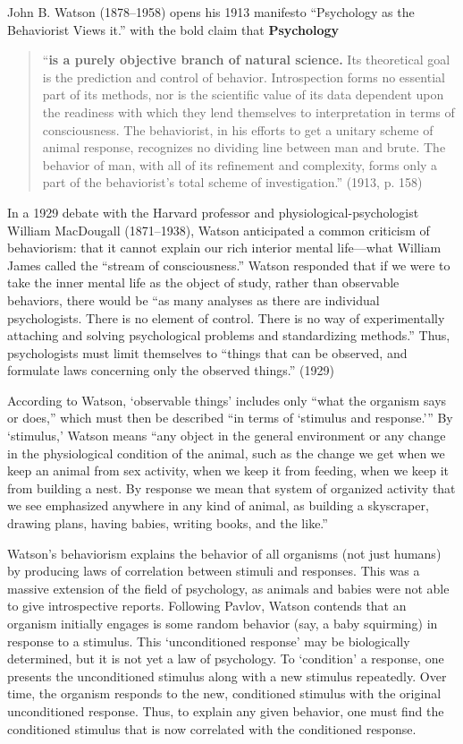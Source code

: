 John B. Watson (1878--1958) opens his 1913 manifesto ``Psychology as the Behaviorist Views it.'' with the bold claim that \textbf{Psychology}

\begin{quote}

``\textbf{is a purely objective branch of natural science.} Its theoretical goal is the prediction and control of behavior. Introspection forms no essential part of its methods, nor is the scientific value of its data dependent upon the readiness with which they lend themselves to interpretation in terms of consciousness. The behaviorist, in his efforts to get a unitary scheme of animal response, recognizes no dividing line between man and brute. The behavior of man, with all of its refinement and complexity, forms only a part of the behaviorist's total scheme of investigation.'' (1913, p. 158)
\end{quote}

In a 1929 debate with the Harvard professor and physiological-psychologist William MacDougall (1871--1938), Watson anticipated a common criticism of behaviorism: that it cannot explain our rich interior mental life---what William James called the ``stream of consciousness.'' Watson responded that if we were to take the inner mental life as the object of study, rather than observable behaviors, there would be ``as many analyses as there are individual psychologists. There is no element of control. There is no way of experimentally attaching and solving psychological problems and standardizing methods.'' Thus, psychologists must limit themselves to ``things that can be observed, and formulate laws concerning only the observed things.'' (1929)

According to Watson, `observable things' includes only ``what the organism says or does,'' which must then be described ``in terms of `stimulus and response.''' By `stimulus,' Watson means ``any object in the general environment or any change in the physiological condition of the animal, such as the change we get when we keep an animal from sex activity, when we keep it from feeding, when we keep it from building a nest. By response we mean that system of organized activity that we see emphasized anywhere in any kind of animal, as building a skyscraper, drawing plans, having babies, writing books, and the like.''

Watson's behaviorism explains the behavior of all organisms (not just humans) by producing laws of correlation between stimuli and responses. This was a massive extension of the field of psychology, as animals and babies were not able to give introspective reports. Following Pavlov, Watson contends that an organism initially engages is some random behavior (say, a baby squirming) in response to a stimulus. This `unconditioned response' may be biologically determined, but it is not yet a law of psychology. To `condition' a response, one presents the unconditioned stimulus along with a new stimulus repeatedly. Over time, the organism responds to the new, conditioned stimulus with the original unconditioned response. Thus, to explain any given behavior, one must find the conditioned stimulus that is now correlated with the conditioned response.

